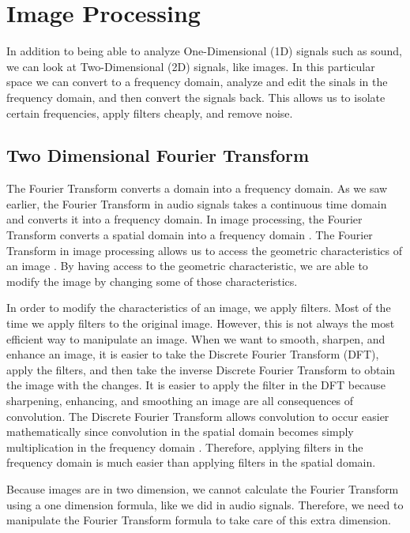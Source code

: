 \documentclass [../article.tex]{subfiles}
\begin{document}
  \section{Image Processing}
  
  In addition to being able to analyze One-Dimensional (1D) signals such as sound, we can look at Two-Dimensional (2D) signals, like images. In this particular space we can convert to a frequency domain, analyze and edit the sinals in the frequency domain, and then convert the signals back. This allows us to isolate certain frequencies, apply filters cheaply, and remove noise.
  
  \subsection{Two Dimensional Fourier Transform} 
  The Fourier Transform converts a domain into a frequency domain.
  As we saw earlier, the Fourier Transform in audio signals takes
  a continuous time domain and converts it into a frequency domain.
  In image processing, the Fourier Transform converts a spatial
  domain into a frequency domain \cite{smith_1997}. The Fourier Transform in image processing allows us to access the geometric
  characteristics of an image \cite{fisher_perkins_walker_wolfart_2003}. By having access to the geometric characteristic, we are able to modify the image by changing some of those characteristics.

  In order to modify the characteristics of an image, we apply
  filters. Most of the time we apply filters to the original
  image. However, this is not always the most efficient way to
  manipulate an image. When we want to smooth, sharpen, and enhance
  an image, it is easier to take the Discrete Fourier Transform (DFT),
  apply the filters, and then take the inverse Discrete Fourier
  Transform to obtain the image with the changes\cite{ludwig}.  It
  is easier to apply the filter in the DFT because sharpening, enhancing, and smoothing an image are all consequences of convolution.  The Discrete Fourier Transform allows convolution to occur easier mathematically since convolution in the spatial domain becomes simply multiplication in the frequency domain \cite{smith_1997}. Therefore, applying filters in the frequency domain is much easier than applying filters in the spatial domain.

  Because images are in two dimension, we cannot calculate the
  Fourier Transform using a one dimension formula, like we did in
  audio signals.  Therefore, we need to manipulate the Fourier
  Transform formula to take care of this extra dimension.
\end{document}
